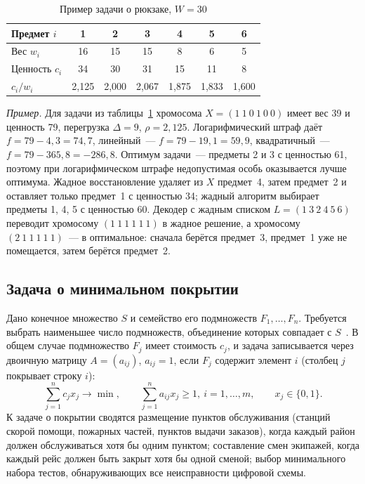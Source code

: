 \begin{table}[!htb]
\caption{Пример задачи о рюкзаке, $W = 30$}
\label{tab:knap-toy}
\centering\small
\begin{tabular}{lcccccc}
\toprule
Предмет $i$ & 1 & 2 & 3 & 4 & 5 & 6 \\
\midrule
Вес $w_i$ & 16 & 15 & 15 & 8 & 6 & 5 \\
Ценность $c_i$ & 34 & 30 & 31 & 15 & 11 & 8 \\
$c_i / w_i$ & 2,125 & 2,000 & 2,067 & 1,875 & 1,833 & 1,600 \\
\bottomrule
\end{tabular}
\end{table}

\emph{Пример.} Для задачи из таблицы~\ref{tab:knap-toy} хромосома $X = (1\ 1\ 0\ 1\ 0\ 0)$ имеет вес 39
и ценность 79, перегрузка $\Delta = 9$, $\rho = 2,125$. Логарифмический штраф даёт $f = 79 - 4,3 = 74,7$,
линейный~--- $f = 79 - 19,1 = 59,9$, квадратичный~--- $f = 79 - 365,8 = -286,8$. Оптимум задачи~--- предметы
2 и 3 с ценностью 61, поэтому при логарифмическом штрафе недопустимая особь оказывается лучше оптимума.
Жадное восстановление удаляет из $X$ предмет~4, затем предмет~2 и оставляет только предмет~1 с ценностью
34; жадный алгоритм выбирает предметы 1, 4, 5 с ценностью 60. Декодер с жадным списком
$L = (1\ 3\ 2\ 4\ 5\ 6)$ переводит хромосому $(1\ 1\ 1\ 1\ 1\ 1)$ в жадное решение, а хромосому
$(2\ 1\ 1\ 1\ 1\ 1)$~--- в оптимальное: сначала берётся предмет~3, предмет~1 уже не помещается, затем
берётся предмет~2.

\subsection{Задача о минимальном покрытии}
\label{sec:cover}

Дано конечное множество $S$ и семейство его подмножеств $F_1, \ldots, F_n$. Требуется выбрать наименьшее
число подмножеств, объединение которых совпадает с $S$~\cite{skobtsov2018}. В общем случае подмножество
$F_j$ имеет стоимость $c_j$, и задача записывается через двоичную матрицу $A = (a_{ij})$, $a_{ij} = 1$,
если $F_j$ содержит элемент $i$ (столбец $j$ покрывает строку $i$):
\begin{equation}
\label{eq:cover}
\sum_{j=1}^{n} c_j x_j \to \min, \qquad \sum_{j=1}^{n} a_{ij} x_j \ge 1, \ i = 1, \ldots, m, \qquad
x_j \in \{0, 1\}.
\end{equation}
К задаче о покрытии сводятся размещение пунктов обслуживания (станций скорой помощи, пожарных частей,
пунктов выдачи заказов), когда каждый район должен обслуживаться хотя бы одним пунктом; составление
смен экипажей, когда каждый рейс должен быть закрыт хотя бы одной сменой; выбор минимального набора
тестов, обнаруживающих все неисправности цифровой схемы.

